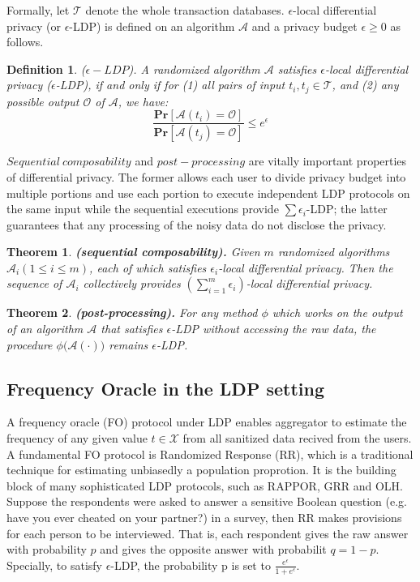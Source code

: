 \documentclass[conference]{IEEEtran}
\begin{document}
Formally, let $\mathcal{T}$ denote the whole  transaction databases. $\epsilon$-local differential privacy (or $\epsilon$-LDP) is defined on an algorithm $\mathcal{A}$ and a privacy budget $\epsilon \geq 0$ as follows.

\newtheorem{Definition}{\bf Definition}
\begin{Definition}
($\epsilon-LDP$). A randomized algorithm $\mathcal{A}$ satisfies $\epsilon$-local differential privacy ($\epsilon$-LDP), if and only if for (1) all pairs of input $t_i,t_j \in \mathcal{T}$, and (2) any possible output $\mathcal{O}$ of $\mathcal{A}$, we have:\\
$$\frac{\mathbf{Pr}[\mathcal{A}(t_i)=\mathcal{O}]}{\mathbf{Pr}[\mathcal{A}(t_j)=\mathcal{O}]} \leq e^{\epsilon}$$
\end{Definition}

$Sequential\  composability$\cite{a9} and $post-processing$\cite{post-processing} are vitally important properties of differential privacy. The former allows each user to divide privacy budget into multiple portions and use each portion to execute independent LDP protocols on the same input while the sequential executions provide $\sum \epsilon_i$-LDP; the latter guarantees that any processing of the noisy data do not disclose the privacy.

\newtheorem{theorem}{\bf Theorem}[section]
\begin{theorem}\label{sequential composability}
\textbf{(sequential composability).} Given $m$ randomized algorithms $\mathcal{A}_i(1 \leq i \leq m)$, each of which satisfies $\epsilon_i$-local differential privacy. Then the sequence of $\mathcal{A}_i$ collectively provides $(\sum_{i=1}^{m} \epsilon_i)$-local differential privacy. 
\end{theorem}

\begin{theorem}\label{post processing}
\textbf{(post-processing).} For any method $\phi$ which works on the output of an algorithm $\mathcal{A}$ that satisfies $\epsilon$-LDP without accessing the raw data, the procedure $\phi \big(\mathcal{A(\cdot)} \big)$ remains $\epsilon$-LDP.
\end{theorem}

\subsection{Frequency Oracle in the LDP setting}
A frequency oracle (FO) protocol under LDP enables aggregator to estimate the frequency of any given value $t \in \mathcal{X}$ from all sanitized data recived from the users. A fundamental FO protocol is Randomized Response (RR)\cite{rr}, which is a traditional technique for estimating unbiasedly a population proprotion. It is the building block of many sophisticated LDP protocols, such as RAPPOR\cite{rappor}, GRR and OLH\cite{a8}. Suppose the respondents were asked to answer a sensitive Boolean question (e.g. have you ever cheated on your partner?) in a survey, then RR makes provisions for each person to be interviewed. That is, each respondent gives the raw answer with probability $p$ and gives the opposite answer with probabilit $q = 1-p$. Specially, to satisfy $\epsilon$-LDP, the probability p is set to $\frac{e^{\epsilon}}{1+e^{\epsilon}}$. 
\end{document}
